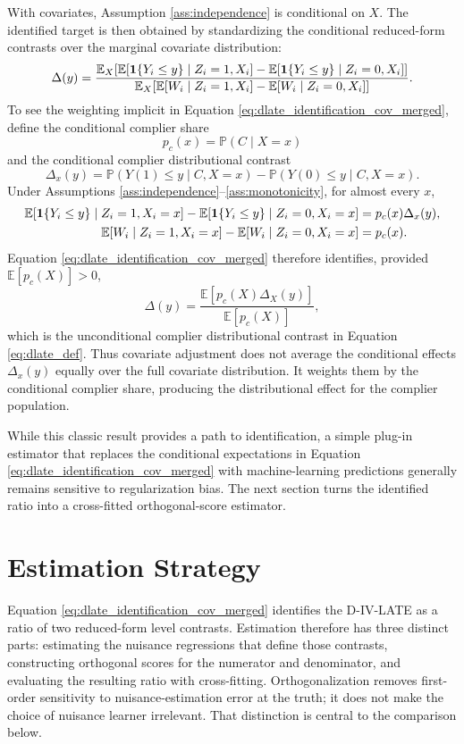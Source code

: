 \documentclass[final,3p,fleqn, 10pt]{elsarticle}
\begin{document}
With covariates, Assumption \ref{ass:independence} is conditional on $X$. The identified target is then obtained by standardizing the conditional reduced-form contrasts over the marginal covariate distribution:
\begin{equation} \label{eq:dlate_identification_cov_merged}
\Delta(y) = \frac{\mathbb{E}_{X}[\mathbb{E}[\mathbf{1}\{Y_i \le y\} \mid Z_i=1, X_i] - \mathbb{E}[\mathbf{1}\{Y_i \le y\} \mid Z_i=0, X_i]]}{\mathbb{E}_{X}[\mathbb{E}[W_i \mid Z_i=1, X_i] - \mathbb{E}[W_i \mid Z_i=0, X_i]]}.
\end{equation}
To see the weighting implicit in Equation \ref{eq:dlate_identification_cov_merged}, define the conditional complier share
\[
p_c(x) = \mathbb{P}(C \mid X=x)
\]
and the conditional complier distributional contrast
\[
\Delta_x(y)=\mathbb{P}(Y(1)\le y\mid C,X=x)-\mathbb{P}(Y(0)\le y\mid C,X=x).
\]
Under Assumptions \ref{ass:independence}--\ref{ass:monotonicity}, for almost every $x$,
\begin{align*}
\mathbb{E}[\mathbf{1}\{Y_i \le y\}\mid Z_i=1,X_i=x]
-\mathbb{E}[\mathbf{1}\{Y_i \le y\}\mid Z_i=0,X_i=x]
&=p_c(x)\Delta_x(y),\\
\mathbb{E}[W_i\mid Z_i=1,X_i=x]-\mathbb{E}[W_i\mid Z_i=0,X_i=x]
&=p_c(x).
\end{align*}
Equation \ref{eq:dlate_identification_cov_merged} therefore identifies, provided $\mathbb{E}[p_c(X)]>0$,
\[
\Delta(y)=\frac{\mathbb{E}[p_c(X)\Delta_X(y)]}{\mathbb{E}[p_c(X)]},
\]
which is the unconditional complier distributional contrast in Equation \ref{eq:dlate_def}. Thus covariate adjustment does not average the conditional effects $\Delta_x(y)$ equally over the full covariate distribution. It weights them by the conditional complier share, producing the distributional effect for the complier population.

While this classic result provides a path to identification, a simple plug-in estimator that replaces the conditional expectations in Equation \ref{eq:dlate_identification_cov_merged} with machine-learning predictions generally remains sensitive to regularization bias. The next section turns the identified ratio into a cross-fitted orthogonal-score estimator.

\section{Estimation Strategy}
\label{sec:estimation}

Equation \ref{eq:dlate_identification_cov_merged} identifies the D-IV-LATE as a ratio of two reduced-form level contrasts. Estimation therefore has three distinct parts: estimating the nuisance regressions that define those contrasts, constructing orthogonal scores for the numerator and denominator, and evaluating the resulting ratio with cross-fitting. Orthogonalization removes first-order sensitivity to nuisance-estimation error at the truth; it does not make the choice of nuisance learner irrelevant. That distinction is central to the comparison below.
\end{document}
